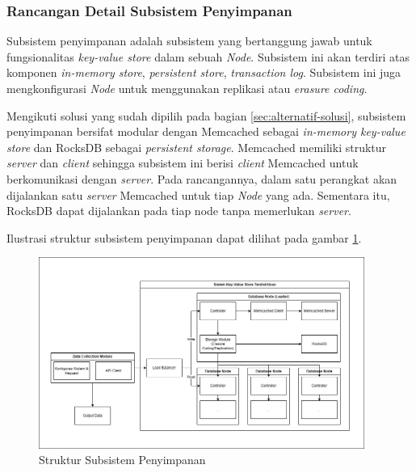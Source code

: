 \subsubsection{Rancangan Detail Subsistem Penyimpanan}
\label{subsubsection:detail-subsistem-penyimpanan}

Subsistem penyimpanan adalah subsistem yang bertanggung jawab untuk fungsionalitas \textit{key-value store} dalam sebuah \textit{Node}. Subsistem ini akan terdiri atas komponen \textit{in-memory store}, \textit{persistent store}, \textit{transaction log}. Subsistem ini juga mengkonfigurasi \textit{Node} untuk menggunakan replikasi atau \textit{erasure coding}.

Mengikuti solusi yang sudah dipilih pada bagian \ref{sec:alternatif-solusi}, subsistem penyimpanan bersifat modular dengan Memcached sebagai \textit{in-memory key-value store} dan RocksDB sebagai \textit{persistent storage}. Memcached memiliki struktur \textit{server} dan \textit{client} sehingga subsistem ini berisi \textit{client} Memcached untuk berkomunikasi dengan \textit{server}. Pada rancangannya, dalam satu perangkat akan dijalankan satu \textit{server} Memcached untuk tiap \textit{Node} yang ada. Sementara itu, RocksDB dapat dijalankan pada tiap node tanpa memerlukan \textit{server}.

Ilustrasi struktur subsistem penyimpanan dapat dilihat pada gambar \ref{fig:storage-subsystem-structure}.

\begin{figure}[ht]
    \centering
    \includegraphics[width=0.95\textwidth]{resources/chapter-3/general-architecture.png}
    \caption{Struktur Subsistem Penyimpanan}
    \label{fig:storage-subsystem-structure}
\end{figure}
